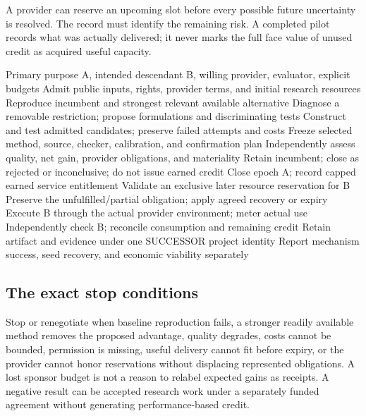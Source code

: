 \documentclass[11pt,letterpaper]{article}
\theoremstyle{remark}\newtheorem{remark}{Remark}[section]
\begin{document}
A provider can reserve an upcoming slot before every possible future uncertainty is resolved. The record must identify the remaining risk. A completed pilot records what was actually delivered; it never marks the full face value of unused credit as acquired useful capacity.

\begin{algorithm}[htbp]\small
\caption{One improvement-for-capacity pilot}
\begin{algorithmic}[1]
\Require Primary purpose A, intended descendant B, willing provider, evaluator, explicit budgets
\State Admit public inputs, rights, provider terms, and initial research resources
\State Reproduce incumbent and strongest relevant available alternative
\State Diagnose a removable restriction; propose formulations and discriminating tests
\State Construct and test admitted candidates; preserve failed attempts and costs
\State Freeze selected method, source, checker, calibration, and confirmation plan
\State Independently assess quality, net gain, provider obligations, and materiality
  \State Retain incumbent; close as rejected or inconclusive; do not issue earned credit
\Else
  \State Close epoch A; record capped earned service entitlement
  \State Validate an exclusive later resource reservation for B
    \State Preserve the unfulfilled/partial obligation; apply agreed recovery or expiry
  \Else
    \State Execute B through the actual provider environment; meter actual use
    \State Independently check B; reconcile consumption and remaining credit
    \State Retain artifact and evidence under one SUCCESSOR project identity
  \EndIf
\EndIf
\State Report mechanism success, seed recovery, and economic viability separately
\end{algorithmic}
\end{algorithm}

\subsection{The exact stop conditions}
Stop or renegotiate when baseline reproduction fails, a stronger readily available method removes the proposed advantage, quality degrades, costs cannot be bounded, permission is missing, useful delivery cannot fit before expiry, or the provider cannot honor reservations without displacing represented obligations. A lost sponsor budget is not a reason to relabel expected gains as receipts. A negative result can be accepted research work under a separately funded agreement without generating performance-based credit.
\end{document}
